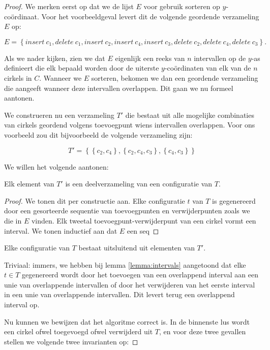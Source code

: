 \begin{proof}
We merken eerst op dat we de lijst $E$ voor gebruik sorteren op
$y$-co\"ordinaat. Voor het voorbeeldgeval levert dit de volgende
geordende verzameling $E$ op: 

\[E = \left\{insert\ c_1, delete\ c_1,
insert\ c_2, insert\ c_4, insert\ c_3, delete\ c_2, delete\ c_4,
delete\ c_3 \right\}.\]

Als we nader kijken, zien we dat $E$ eigenlijk een reeks van $n$
intervallen op de $y$-as definieert die elk bepaald worden door de
uiterste $y$-co\"ordinaten van elk van de $n$ cirkels in $C$. Wanneer
we $E$ sorteren, bekomen we dan een geordende verzameling die aangeeft
wanneer deze intervallen overlappen. Dit gaan we nu formeel aantonen.

We construeren nu een verzameling $T'$ die bestaat uit alle mogelijke
combinaties van cirkels geordend volgens toevoegpunt wiens intervallen
overlappen. Voor ons voorbeeld zou dit bijvoorbeeld de volgende
verzameling zijn:

\[T' = \left\{\left\{c_2,c_4\right\},\left\{c_2,c_4,c_3\right\},\left\{c_4,c_3\right\}\right\}\]

We willen het volgende aantonen:

\begin{lemma}
Elk element van $T'$ is een deelverzameling van een configuratie van $T$.
\label{lemma:intervals}
\end{lemma}
\begin{proof}
We tonen dit per constructie aan. Elke configuratie $t$ van $T$ is
gegenereerd door een gesorteerde sequentie van toevoegpunten en
verwijderpunten zoals we die in $E$ vinden. Elk tweetal
toevoegpunt-verwijderpunt van een cirkel vormt een interval. We tonen
inductief aan dat $E$ een seq
\end{proof}

\begin{gevolg}
Elke configuratie van $T$ bestaat uitsluitend uit elementen van $T'$.
\label{gevolg:sweepline}
\end{gevolg}

Triviaal: immers, we hebben bij lemma \ref{lemma:intervals} aangetoond
dat elke $t \in T$ gegenereerd wordt door het toevoegen van een
overlappend interval aan een unie van overlappende intervallen of door
het verwijderen van het eerste interval in een unie van overlappende
intervallen. Dit levert terug een overlappend interval op.

Nu kunnen we bewijzen dat het algoritme correct is. In de binnenste
lus wordt een cirkel ofwel toegevoegd ofwel verwijderd uit $T$, en
voor deze twee gevallen stellen we volgende twee invarianten op:


\end{proof}

